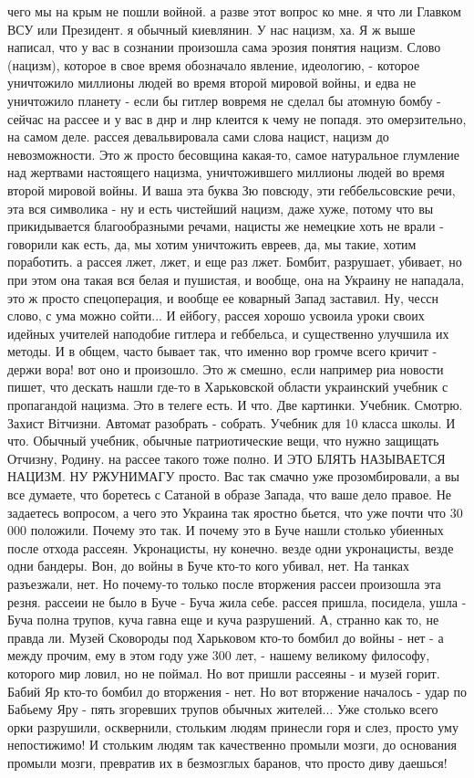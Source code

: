 чего мы на крым не пошли войной. а разве этот вопрос ко мне. я
что ли Главком ВСУ или Президент. я обычный киевлянин. У нас
нацизм, ха. Я ж выше написал, что у вас в сознании произошла
сама эрозия понятия нацизм. Слово (нацизм), которое в свое время
обозначало явление, идеологию, - которое уничтожило миллионы
людей во время второй мировой войны, и едва не уничтожило
планету - если бы гитлер вовремя не сделал бы атомную бомбу -
сейчас на рассее и у вас в днр и лнр клеится к чему не попадя.
это омерзительно, на самом деле. рассея девальвировала сами
слова нацист, нацизм до невозможности. Это ж просто бесовщина
какая-то, самое натуральное глумление над жертвами настоящего
нацизма, уничтожившего миллионы людей во время второй мировой
войны. И ваша эта буква Зю повсюду, эти геббельсовские речи, эта
вся символика - ну и есть чистейший нацизм, даже хуже, потому
что вы прикидывается благообразными речами, нацисты же немецкие
хоть не врали - говорили как есть, да, мы хотим уничтожить
евреев, да, мы такие, хотим поработить. а рассея лжет, лжет, и
еще раз лжет. Бомбит, разрушает, убивает, но при этом она такая
вся белая и пушистая, и вообще, она на Украину не нападала, это
ж просто спецоперация, и вообще ее коварный Запад заставил. Ну,
чессн слово, с ума можно сойти... И ейбогу, рассея хорошо
усвоила уроки своих идейных учителей наподобие гитлера и
геббельса, и существенно улучшила их методы. И в общем, часто
бывает так, что именно вор громче всего кричит - держи вора! вот
оно и произошло. Это ж смешно, если например риа новости пишет,
что дескать нашли где-то в Харьковской области украинский
учебник с пропагандой нацизма. Это в телеге есть. И что. Две
картинки. Учебник. Смотрю. Захист Вітчизни. Автомат разобрать -
собрать. Учебник для 10 класса школы. И что. Обычный учебник,
обычные патриотические вещи, что нужно защищать Отчизну, Родину.
на рассее такого тоже полно. И ЭТО БЛЯТЬ НАЗЫВАЕТСЯ НАЦИЗМ. НУ
РЖУНИМАГУ просто. Вас так смачно уже прозомбировали, а вы все
думаете, что боретесь с Сатаной в образе Запада, что ваше дело
правое. Не задаетесь вопросом, а чего это Украина так яростно
бьется, что уже почти что 30 000 положили.  Почему это так. И
почему это в Буче нашли столько убиенных после отхода рассеян.
Укронацисты, ну конечно. везде одни укронацисты, везде одни
бандеры.  Вон, до войны в Буче кто-то кого убивал, нет. На
танках разъезжали, нет. Но почему-то только после вторжения
рассеи произошла эта резня. рассеии не было в Буче - Буча жила
себе. рассея пришла, посидела, ушла - Буча полна трупов, куча
гавна еще и куча разрушений. А, странно как то, не правда ли.
Музей Сковороды под Харьковом кто-то бомбил до войны - нет - а
между прочим, ему в этом году уже 300 лет, - нашему великому
философу, которого мир ловил, но не поймал. Но вот пришли
рассеяны - и музей горит. Бабий Яр кто-то бомбил до вторжения -
нет. Но вот вторжение началось - удар по Бабьему Яру - пять
згоревших трупов обычных жителей... Уже столько всего орки
разрушили, осквернили, стольким людям принесли горя и слез,
просто уму непостижимо! И стольким людям так качественно промыли
мозги, до основания промыли мозги, превратив их в безмозглых
баранов, что просто диву даешься!

